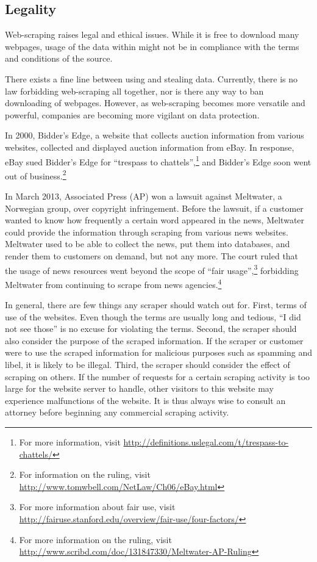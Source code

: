\documentclass[12pt,twoside,draft]{report}
\begin{document}
\subsection{Legality}

Web-scraping raises legal and ethical issues. While it is free to download many webpages, usage of the data within might not be in compliance with the terms and conditions of the source. 

There exists a fine line between using and stealing data. Currently, there is no law forbidding web-scraping all together, nor is there any way to ban downloading of webpages. However, as web-scraping becomes more versatile and powerful, companies are becoming more vigilant on data protection. 

In 2000, Bidder's Edge, a website that collects auction information from various websites, collected and displayed auction information from eBay. In response, eBay sued Bidder's Edge for ``trespass to chattels'',\footnote{For more information, visit \url{http://definitions.uslegal.com/t/trespass-to-chattels/}} and Bidder's Edge soon went out of business.\footnote{For information on the ruling, visit \url{http://www.tomwbell.com/NetLaw/Ch06/eBay.html}}

In March 2013, Associated Press (AP) won a lawsuit against Meltwater, a Norwegian group, over copyright infringement. Before the lawsuit, if a customer wanted to know how frequently a certain word appeared in the news, Meltwater could provide the information through scraping from various news websites. Meltwater used to be able to collect the news, put them into databases, and render them to customers on demand, but not any more. The court ruled that the usage of news resources went beyond the scope of ``fair usage'',\footnote{For more information about fair use, visit \url{http://fairuse.stanford.edu/overview/fair-use/four-factors/}} forbidding Meltwater from continuing to scrape from news agencies.\footnote{For more information on the ruling, visit \url{http://www.scribd.com/doc/131847330/Meltwater-AP-Ruling}}

In general, there are few things any scraper should watch out for. First, terms of use of the websites. Even though the terms are usually long and tedious, ``I did not see those'' is no excuse for violating the terms. Second, the scraper should also consider the purpose of the scraped information. If the scraper or customer were to use the scraped information for malicious purposes such as spamming and libel, it is likely to be illegal. Third, the scraper should consider the effect of scraping on others. If the number of requests for a certain scraping activity is too large for the website server to handle, other visitors to this website may experience malfunctions of the website. It is thus always wise to consult an attorney before beginning any commercial scraping activity.
\end{document}
